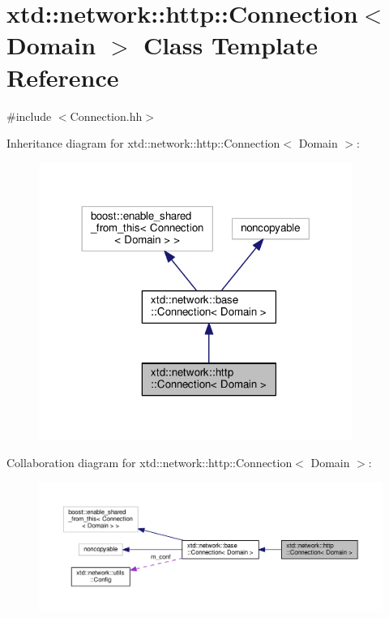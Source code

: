 \hypertarget{classxtd_1_1network_1_1http_1_1Connection}{}\section{xtd\+:\+:network\+:\+:http\+:\+:Connection$<$ Domain $>$ Class Template Reference}
\label{classxtd_1_1network_1_1http_1_1Connection}


{\ttfamily \#include $<$Connection.\+hh$>$}



Inheritance diagram for xtd\+:\+:network\+:\+:http\+:\+:Connection$<$ Domain $>$\+:
\nopagebreak
\begin{figure}[H]
\begin{center}
\leavevmode
\includegraphics[width=290pt]{classxtd_1_1network_1_1http_1_1Connection__inherit__graph}
\end{center}
\end{figure}


Collaboration diagram for xtd\+:\+:network\+:\+:http\+:\+:Connection$<$ Domain $>$\+:
\nopagebreak
\begin{figure}[H]
\begin{center}
\leavevmode
\includegraphics[width=350pt]{classxtd_1_1network_1_1http_1_1Connection__coll__graph}
\end{center}
\end{figure}
